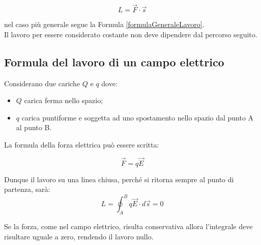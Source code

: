 \begin{equation*}
    L = \vec{F}\cdot\vec{s}
\end{equation*}

nel caso più generale segue la Formula \ref{formulaGeneraleLavoro}.\\
Il lavoro per essere considerato costante non deve dipendere dal percorso seguito.


\subsection{Formula del lavoro di un campo elettrico}

Considerano due cariche $Q$ e $q$ dove:
\begin{itemize}
    \item $Q$ carica ferma nello spazio;
    \item $q$ carica puntiforme e soggetta ad uno spostamento nello spazio dal punto A al punto B.
\end{itemize}

La formula della forza elettrica può essere scritta:

\begin{equation*}
    \vec{F} = q\vec{E}
\end{equation*}

Dunque il lavoro su una linea chiusa, perché si ritorna sempre al punto di partenza, sarà:
\begin{equation}
    L = \oint_A^B q\vec{E}\cdot d\vec{s} = 0
\end{equation}

Se la forza, come nel campo elettrico, risulta conservativa allora l'integrale deve risultare uguale a zero, rendendo il lavoro nullo.


